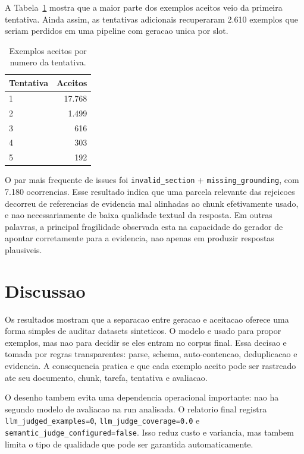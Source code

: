 \documentclass{article}
\begin{document}
A Tabela~\ref{tab:attempts} mostra que a maior parte dos exemplos aceitos veio
da primeira tentativa. Ainda assim, as tentativas adicionais recuperaram 2.610
exemplos que seriam perdidos em uma pipeline com geracao unica por slot.

\begin{table}[t]
\centering
\caption{Exemplos aceitos por numero da tentativa.}
\label{tab:attempts}
\small
\begin{tabular}{lr}
\toprule
Tentativa & Aceitos \\
\midrule
1 & 17.768 \\
2 & 1.499 \\
3 & 616 \\
4 & 303 \\
5 & 192 \\
\bottomrule
\end{tabular}
\end{table}

O par mais frequente de issues foi \texttt{invalid\_section} +
\texttt{missing\_grounding}, com 7.180 ocorrencias. Esse resultado indica que
uma parcela relevante das rejeicoes decorreu de referencias de evidencia
mal alinhadas ao chunk efetivamente usado, e nao necessariamente de baixa
qualidade textual da resposta. Em outras palavras, a principal fragilidade
observada esta na capacidade do gerador de apontar corretamente para a
evidencia, nao apenas em produzir respostas plausiveis.

\section{Discussao}

Os resultados mostram que a separacao entre geracao e aceitacao oferece uma
forma simples de auditar datasets sinteticos. O modelo e usado para propor
exemplos, mas nao para decidir se eles entram no corpus final. Essa decisao e
tomada por regras transparentes: parse, schema, auto-contencao, deduplicacao e
evidencia. A consequencia pratica e que cada exemplo aceito pode ser rastreado
ate seu documento, chunk, tarefa, tentativa e avaliacao.

O desenho tambem evita uma dependencia operacional importante: nao ha segundo
modelo de avaliacao na run analisada. O relatorio final registra
\texttt{llm\_judged\_examples=0}, \texttt{llm\_judge\_coverage=0.0} e
\texttt{semantic\_judge\_configured=false}. Isso reduz custo e variancia, mas
tambem limita o tipo de qualidade que pode ser garantida automaticamente.
\end{document}
